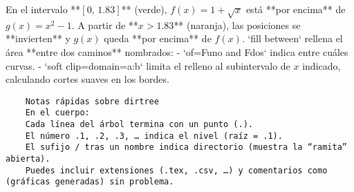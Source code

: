 En el intervalo **$[0,\,1.83]$** (verde), \(f(x)=1+\sqrt{x}\) está **por encima** de \(g(x)=x^2-1\).  
A partir de **$x>1.83$** (naranja), las posiciones se **invierten** y \(g(x)\) queda **por encima** de \(f(x)\).  
`fill between` rellena el área **entre dos caminos** nombrados:  
- `of=Funo and Fdos` indica entre cuáles curvas.  
- `soft clip={domain=a:b}` limita el relleno al subintervalo de \(x\) indicado, calculando cortes suaves en los bordes.  \\[25mm]


\begin{verbatim}
	Notas rápidas sobre dirtree
	En el cuerpo: 
	Cada línea del árbol termina con un punto (.).
	El número .1, .2, .3, … indica el nivel (raíz = .1).
	El sufijo / tras un nombre indica directorio (muestra la “ramita” abierta).
	Puedes incluir extensiones (.tex, .csv, …) y comentarios como (gráficas generadas) sin problema.
\end{verbatim}


